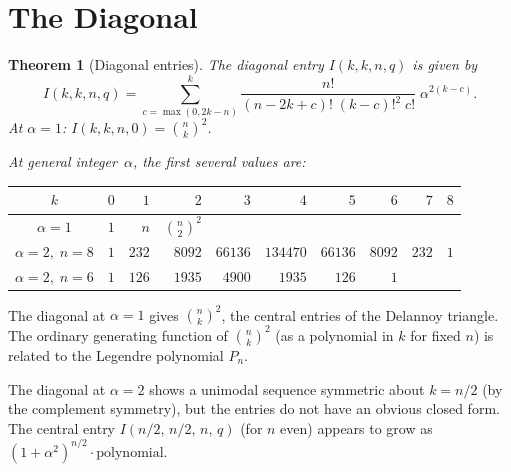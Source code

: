 \documentclass[11pt,a4paper]{article}
\theoremstyle{plain}
\newtheorem{theorem}{Theorem}[section]
\theoremstyle{definition}
\begin{document}
\section{The Diagonal}

\begin{tcolorbox}[colback=black!5, colframe=black!5, boxrule=0pt,
  sharp corners]
\begin{theorem}[Diagonal entries]\label{thm:diag}
The diagonal entry $I(k, k, n, q)$ is given by
\begin{equation}\label{eq:diag}
  I(k, k, n, q) = \sum_{c=\max(0,2k-n)}^{k}
  \frac{n!}{(n{-}2k{+}c)!\;(k{-}c)!^2\;c!}\;\alpha^{2(k-c)}.
\end{equation}
At $\alpha = 1$: $I(k,k,n,0) = \binom{n}{k}^2$.

At general integer~$\alpha$, the first several values are:

\medskip
\begin{center}
\renewcommand{\arraystretch}{1.15}
\begin{tabular}{c|rrrrrrrrr}
$k$ & $0$ & $1$ & $2$ & $3$ & $4$ & $5$ & $6$ & $7$ & $8$ \\
\hline
$\alpha=1$ & $1$ & $n$ & $\binom{n}{2}^2$ & &&&& \\
$\alpha=2,\; n=8$ & $1$ & $232$ & $8092$ & $66136$ & $134470$
  & $66136$ & $8092$ & $232$ & $1$ \\
$\alpha=2,\; n=6$ & $1$ & $126$ & $1935$ & $4900$ & $1935$
  & $126$ & $1$ & & \\
\end{tabular}
\end{center}
\end{theorem}
\end{tcolorbox}

\begin{tcolorbox}[colback=yellow!10, colframe=yellow!10, boxrule=0pt,
  sharp corners]
The diagonal at $\alpha = 1$ gives $\binom{n}{k}^2$, the central
entries of the Delannoy triangle. The ordinary generating function of
$\binom{n}{k}^2$ (as a polynomial in $k$ for fixed $n$) is related
to the Legendre polynomial $P_n$.

The diagonal at $\alpha = 2$ shows a unimodal sequence symmetric
about $k = n/2$ (by the complement symmetry), but the entries do
not have an obvious closed form. The central entry
$I(n/2,\, n/2,\, n,\, q)$ (for $n$ even) appears to grow as
$(1 + \alpha^2)^{n/2} \cdot \text{polynomial}$.
\end{tcolorbox}
\end{document}
